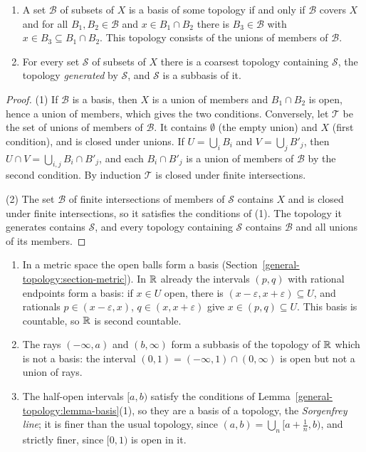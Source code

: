 \begin{lemma}\label{general-topology:lemma-basis}
\begin{enumerate}
\item A set $\mathcal{B}$ of subsets of $X$ is a basis of some topology if and only if $\mathcal{B}$ covers $X$ and for all
$B_1, B_2 \in \mathcal{B}$ and $x \in B_1 \cap B_2$ there is $B_3 \in \mathcal{B}$ with $x \in B_3 \subseteq B_1 \cap B_2$. This topology
consists of the unions of members of $\mathcal{B}$.
\item For every set $\mathcal{S}$ of subsets of $X$ there is a coarsest topology containing $\mathcal{S}$, the topology \emph{generated}
by $\mathcal{S}$, and $\mathcal{S}$ is a subbasis of it.
\end{enumerate}
\end{lemma}

\begin{proof}
(1) If $\mathcal{B}$ is a basis, then $X$ is a union of members and $B_1 \cap B_2$ is open, hence a union of members, which gives the two
conditions. Conversely, let $\mathcal{T}$ be the set of unions of members of $\mathcal{B}$. It contains $\emptyset$ (the empty union) and $X$
(first condition), and is closed under unions. If $U = \bigcup_i B_i$ and $V = \bigcup_j B'_j$, then $U \cap V = \bigcup_{i,j} B_i \cap B'_j$,
and each $B_i \cap B'_j$ is a union of members of $\mathcal{B}$ by the second condition. By induction $\mathcal{T}$ is closed under finite
intersections.

(2) The set $\mathcal{B}$ of finite intersections of members of $\mathcal{S}$ contains $X$ and is closed under finite intersections, so it
satisfies the conditions of (1). The topology it generates contains $\mathcal{S}$, and every topology containing $\mathcal{S}$ contains
$\mathcal{B}$ and all unions of its members.
\end{proof}

\begin{example}\label{general-topology:example-bases}
\begin{enumerate}
\item In a metric space the open balls form a basis (Section~\ref{general-topology:section-metric}). In $\mathbb{R}$ already the intervals $(p, q)$ with rational endpoints form a basis: if $x \in U$ open, there is
$(x - \varepsilon, x + \varepsilon) \subseteq U$, and rationals $p \in (x - \varepsilon, x)$, $q \in (x, x + \varepsilon)$ give $x \in (p, q) \subseteq U$. This basis is countable, so $\mathbb{R}$ is second countable.
\item The rays $(-\infty, a)$ and $(b, \infty)$ form a subbasis of the topology of $\mathbb{R}$ which is not a basis: the interval $(0, 1) = (-\infty, 1) \cap (0, \infty)$ is open but not a union of rays.
\item The half-open intervals $[a, b)$ satisfy the conditions of Lemma~\ref{general-topology:lemma-basis}(1), so they are a basis of a topology, the \emph{Sorgenfrey line}; it is finer than the usual topology,
since $(a, b) = \bigcup_n[a + \frac1n, b)$, and strictly finer, since $[0, 1)$ is open in it.
\end{enumerate}
\end{example}


